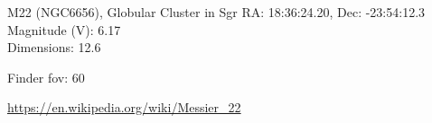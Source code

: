 \begin{block}{M22 (NGC6656), Globular Cluster in Sgr}
    RA: 18:36:24.20, Dec: -23:54:12.3 \\ 
    Magnitude (V): 6.17 \\ 
    Dimensions: 12.6 

    Finder fov: 60 

    \url{https://en.wikipedia.org/wiki/Messier_22} 
\end{block}